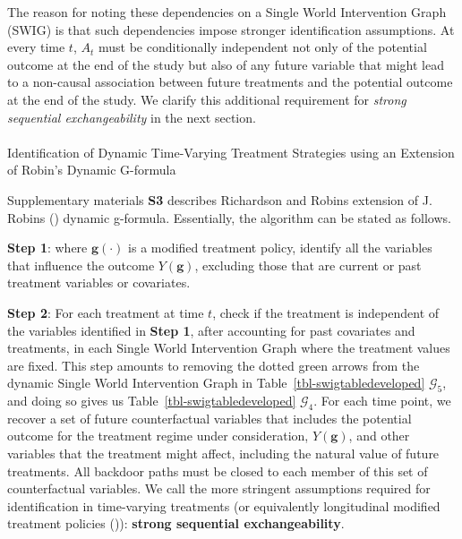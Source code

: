 \documentclass[
  single column]{article}
\makeatletter
\let\oldparagraph\paragraph
\renewcommand{\paragraph}{
    \@ifstar
      \xxxParagraphStar
      \xxxParagraphNoStar
  }
\newcommand{\xxxParagraphStar}[1]{\oldparagraph*{#1}\mbox{}}
\newcommand{\xxxParagraphNoStar}[1]{\oldparagraph{#1}\mbox{}}
\makeatother
\begin{document}
The reason for noting these dependencies on a Single World Intervention
Graph (SWIG) is that such dependencies impose stronger identification
assumptions. At every time \(t\), \(A_t\) must be conditionally
independent not only of the potential outcome at the end of the study
but also of any future variable that might lead to a non-causal
association between future treatments and the potential outcome at the
end of the study. We clarify this additional requirement for
\emph{strong sequential exchangeability} in the next section.

\paragraph{Identification of Dynamic Time-Varying Treatment Strategies
using an Extension of Robin's Dynamic
G-formula}\label{identification-of-dynamic-time-varying-treatment-strategies-using-an-extension-of-robins-dynamic-g-formula}

Supplementary materials \textbf{S3} describes Richardson and Robins
extension of J. Robins () dynamic
g-formula. Essentially, the algorithm can be stated as follows.

\textbf{Step 1}: where \(\mathbf{g}(\cdot)\) is a modified treatment
policy, identify all the variables that influence the outcome
\(Y(\mathbf{g})\), excluding those that are current or past treatment
variables or covariates.

\textbf{Step 2}: For each treatment at time \(t\), check if the
treatment is independent of the variables identified in \textbf{Step 1},
after accounting for past covariates and treatments, in each Single
World Intervention Graph where the treatment values are fixed. This step
amounts to removing the dotted green arrows from the dynamic Single
World Intervention Graph in Table~\ref{tbl-swigtabledeveloped}
\(\mathcal{G}_5\), and doing so gives us
Table~\ref{tbl-swigtabledeveloped} \(\mathcal{G}_4\). For each time
point, we recover a set of future counterfactual variables that includes
the potential outcome for the treatment regime under consideration,
\(Y(\mathbf{g})\), and other variables that the treatment might affect,
including the natural value of future treatments. All backdoor paths
must be closed to each member of this set of counterfactual variables.
We call the more stringent assumptions required for identification in
time-varying treatments (or equivalently longitudinal modified treatment
policies ()):
\textbf{strong sequential exchangeability}.
\end{document}
